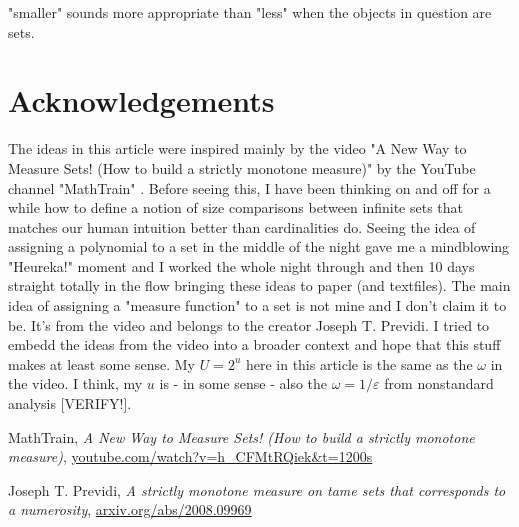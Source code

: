 \documentclass[12pt]{article}
\begin{document}
"smaller" sounds more appropriate than "less" when the objects in question are sets.

\section{Acknowledgements}
The ideas in this article were inspired mainly by the video "A New Way to Measure Sets! (How to build a strictly monotone measure)" by the YouTube channel "MathTrain" \cite{MathTrain1}. Before seeing this, I have been thinking on and off for a while how to define a notion of size comparisons between infinite sets that matches our human intuition better than cardinalities do. Seeing the idea of assigning a polynomial to a set in the middle of the night gave me a mindblowing "Heureka!" moment and I worked the whole night through and then 10 days straight totally in the flow bringing these ideas to paper (and textfiles). The main idea of assigning a "measure function" to a set is not mine and I don't claim it to be. It's from the video and belongs to the creator Joseph T. Previdi. I tried to embedd the ideas from the video into a broader context and hope that this stuff makes at least some sense. My $U = 2^u$ here in this article is the same as the $\omega$ in the video. I think, my $u$ is - in some sense - also the $\omega = 1/\varepsilon$ from nonstandard analysis [VERIFY!].


%

\begin{thebibliography}{9}
MathTrain,
\textit{A New Way to Measure Sets! (How to build a strictly monotone measure)},
\href{https://www.youtube.com/watch?v=h_CFMtRQiek&t=1200s}{youtube.com/watch?v=h\_CFMtRQiek\&t=1200s} 

 Joseph T. Previdi,
 \textit{A strictly monotone measure on tame sets that corresponds to a numerosity},
 \href{https://arxiv.org/abs/2008.09969}{arxiv.org/abs/2008.09969}
\end{thebibliography}
 
\end{document}
